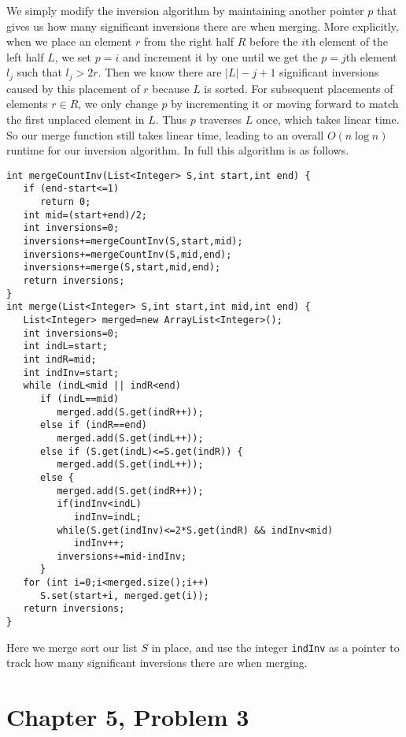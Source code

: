 \documentclass[12pt]{article}
\begin{document}
We simply modify the inversion algorithm by maintaining another pointer \(p\) that gives us how many significant inversions there are when merging.
More explicitly, when we place an element \(r\) from the right half \(R\) before the \(i\)th element of the left half \(L\), we set \(p=i\) and increment it by one until
we get the \(p=j\)th element \(l_j\) such that \(l_j>2r\). Then we know there are \(|L|-j+1\) significant inversions caused by this placement of \(r\) because \(L\)
is sorted. For subsequent placements of elements \(r\in R\), we only change \(p\) by incrementing it or moving forward to match the first unplaced element in \(L\). Thus
\(p\) traverses \(L\) once, which takes linear time. So our merge function still takes linear time, leading to an overall \(O(n \log n)\) runtime for our inversion algorithm.
In full this algorithm is as follows.
\begin{verbatim}
int mergeCountInv(List<Integer> S,int start,int end) {
   if (end-start<=1)
      return 0;
   int mid=(start+end)/2;
   int inversions=0;
   inversions+=mergeCountInv(S,start,mid);
   inversions+=mergeCountInv(S,mid,end);
   inversions+=merge(S,start,mid,end);
   return inversions;
}
int merge(List<Integer> S,int start,int mid,int end) {
   List<Integer> merged=new ArrayList<Integer>();
   int inversions=0;
   int indL=start;
   int indR=mid;
   int indInv=start;
   while (indL<mid || indR<end)
      if (indL==mid)
         merged.add(S.get(indR++));
      else if (indR==end)
         merged.add(S.get(indL++));
      else if (S.get(indL)<=S.get(indR)) {
         merged.add(S.get(indL++));
      else {
         merged.add(S.get(indR++));
         if(indInv<indL)
            indInv=indL;
         while(S.get(indInv)<=2*S.get(indR) && indInv<mid)
            indInv++;
         inversions+=mid-indInv;
      }
   for (int i=0;i<merged.size();i++)
      S.set(start+i, merged.get(i));
   return inversions;
}
\end{verbatim}
Here we merge sort our list \(S\) in place, and use the integer \texttt{indInv} as a pointer to track how many significant inversions there are when merging.

\pagebreak

\section*{Chapter 5, Problem 3}
\end{document}
